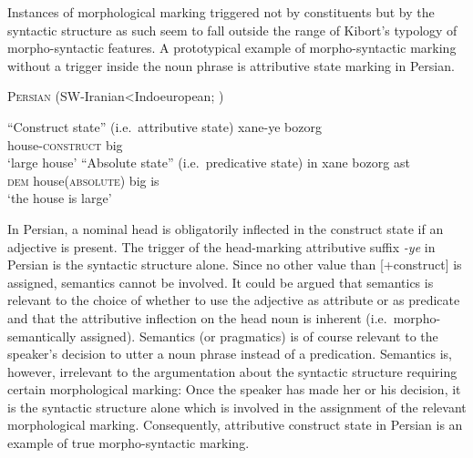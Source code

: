 Instances of morphological marking triggered not by constituents but by the syntactic structure as such seem to fall outside the range of Kibort's typology of morpho-syntactic features. A prototypical example of morpho-syntactic marking without a trigger inside the noun phrase is attributive state marking in Persian.
\begin{exe}
\ex \textsc{Persian} (SW-Iranian<Indoeuropean; \citealt{mahootian1997})
\label{persian state}
\begin{xlist}
\ex “Construct state” (i.e.~attributive state)
\gll 	xane-ye bozorg\\
	house-\textsc{construct} big\\
\glt 	‘large house’
\ex “Absolute state” (i.e.~predicative state)
\gll	in xane bozorg ast\\
	\textsc{dem} house(\textsc{absolute}) big is\\
\glt	‘the house is large’
\end{xlist}
\end{exe}
In Persian, a nominal head is obligatorily inflected in the construct state if an adjective is present. The trigger of the head-marking attributive suffix \textit{-ye} in Persian is the syntactic structure alone. Since no other value than [+construct] is assigned, semantics cannot be involved. It could be argued that semantics is relevant to the choice of whether to use the adjective as attribute or as predicate and that the attributive inflection on the head noun is inherent (i.e.~morpho-semantically assigned). Semantics (or pragmatics) is of course relevant to the speaker's decision to utter a noun phrase instead of a predication. Semantics is, however, irrelevant to the argumentation about the syntactic structure requiring certain morphological marking: Once the speaker has made her or his decision, it is the syntactic structure alone which is involved in the assignment of the relevant morphological marking. Consequently, attributive construct state in Persian is an example of true morpho-syntactic marking.

